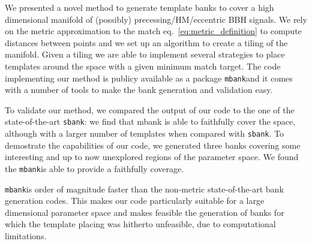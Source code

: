 \documentclass[twocolumn,showpacs,preprintnumbers,nofootinbib,prd,
superscriptaddress,10pt]{revtex4-2}
\newcommand{\mbank}{\texttt{mbank}}
\begin{document}
We presented a novel method to generate template banks to cover a high dimensional manifold of (possibly) precessing/HM/eccentric BBH signals.
We rely on the metric approximation to the match eq.~\eqref{eq:metric_definition} to compute distances between points and we set up an algorithm to create a tiling of the manifold. Given a tiling we are able to implement several strategies to place templates around the space with a given minimum match target.
The code implementing our method is publicy available as a package \mbank and it comes with a number of tools to make the bank generation and validation easy.

To validate our method, we compared the output of our code to the one of the state-of-the-art \texttt{sbank}: we find that mbank is able to faithfully cover the space, although with a larger number of templates when compared with \texttt{sbank}.
To demostrate the capabilities of our code, we generated three banks covering some interesting and up to now unexplored regions of the parameter space. We found the \mbank is able to provide a faithfully coverage.

\mbank is order of magnitude faster than the non-metric state-of-the-art bank generation codes. This makes our code particularly suitable for a large dimensional parameter space and makes feasible the generation of banks for which the template placing was hitherto unfeasible, due to computational limitations.
\end{document}
